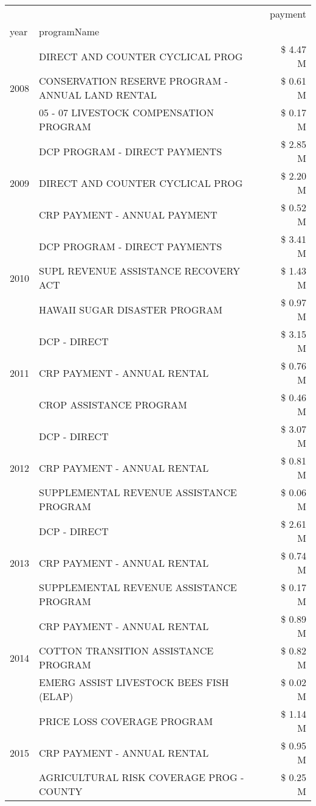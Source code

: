 \begin{tabular}{llr}
\toprule
 &  & payment \\
year & programName &  \\
\midrule
\multirow[t]{3}{*}{2008} & DIRECT AND COUNTER CYCLICAL PROG & \$ 4.47 M \\
 & CONSERVATION RESERVE PROGRAM - ANNUAL LAND RENTAL & \$ 0.61 M \\
 & 05 - 07 LIVESTOCK COMPENSATION PROGRAM & \$ 0.17 M \\
\cline{1-3}
\multirow[t]{3}{*}{2009} & DCP PROGRAM - DIRECT PAYMENTS & \$ 2.85 M \\
 & DIRECT AND COUNTER CYCLICAL PROG & \$ 2.20 M \\
 & CRP PAYMENT - ANNUAL PAYMENT & \$ 0.52 M \\
\cline{1-3}
\multirow[t]{3}{*}{2010} & DCP PROGRAM - DIRECT PAYMENTS & \$ 3.41 M \\
 & SUPL REVENUE ASSISTANCE RECOVERY ACT & \$ 1.43 M \\
 & HAWAII SUGAR DISASTER PROGRAM & \$ 0.97 M \\
\cline{1-3}
\multirow[t]{3}{*}{2011} & DCP - DIRECT & \$ 3.15 M \\
 & CRP PAYMENT - ANNUAL RENTAL & \$ 0.76 M \\
 & CROP ASSISTANCE PROGRAM & \$ 0.46 M \\
\cline{1-3}
\multirow[t]{3}{*}{2012} & DCP - DIRECT & \$ 3.07 M \\
 & CRP PAYMENT - ANNUAL RENTAL & \$ 0.81 M \\
 & SUPPLEMENTAL REVENUE ASSISTANCE PROGRAM & \$ 0.06 M \\
\cline{1-3}
\multirow[t]{3}{*}{2013} & DCP - DIRECT & \$ 2.61 M \\
 & CRP PAYMENT - ANNUAL RENTAL & \$ 0.74 M \\
 & SUPPLEMENTAL REVENUE ASSISTANCE PROGRAM & \$ 0.17 M \\
\cline{1-3}
\multirow[t]{3}{*}{2014} & CRP PAYMENT - ANNUAL RENTAL & \$ 0.89 M \\
 & COTTON TRANSITION ASSISTANCE PROGRAM & \$ 0.82 M \\
 & EMERG ASSIST LIVESTOCK BEES FISH (ELAP) & \$ 0.02 M \\
\cline{1-3}
\multirow[t]{3}{*}{2015} & PRICE LOSS COVERAGE PROGRAM & \$ 1.14 M \\
 & CRP PAYMENT - ANNUAL RENTAL & \$ 0.95 M \\
 & AGRICULTURAL RISK COVERAGE PROG - COUNTY & \$ 0.25 M \\

\end{tabular}
